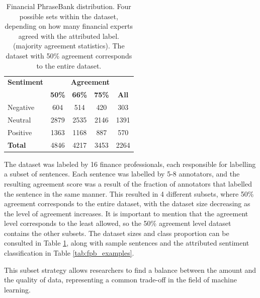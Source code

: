 \documentclass[conference]{IEEEtran}
\begin{document}
\begin{table}[H]
\centering
\caption{Financial PhraseBank distribution. Four possible sets within the dataset, depending on how many financial experts agreed with the attributed label. (majority agreement statistics). The dataset with 50\% agreement corresponds to the entire dataset.}

\label{agreement_datasets}
\begin{tabular}{lcccc}
\toprule
\textbf{Sentiment} & \multicolumn{4}{c}{\textbf{Agreement}} \\
\cmidrule(lr){2-5}
 & \textbf{50\%} & \textbf{66\%} & \textbf{75\%} & \textbf{All} \\
\midrule
Negative & 604 & 514 & 420 & 303 \\
Neutral & 2879 & 2535 & 2146 & 1391 \\
Positive & 1363 & 1168 & 887 & 570 \\
\midrule
\textbf{Total} & 4846 & 4217 & 3453 & 2264 \\
\bottomrule
\end{tabular}
\end{table}

The dataset was labeled by 16 finance professionals, each responsible for labelling a subset of sentences. Each sentence was labelled by 5-8 annotators, and the resulting agreement score was a result of the fraction of annotators that labelled the sentence in the same manner. This resulted in 4 different subsets, where 50\% agreement corresponds to the entire dataset, with the dataset size decreasing as the level of agreement increases. It is important to mention that the agreement level corresponds to the least allowed, so the 50\% agreement level dataset contains the other subsets. The dataset sizes and class proportion can be consulted in Table \ref{agreement_datasets}, along with sample sentences and the attributed sentiment classification in Table \ref{tab:fpb_examples}.

This subset strategy allows researchers to find a balance between the amount and the quality of data, representing a common trade-off in the field of machine learning.
\end{document}
